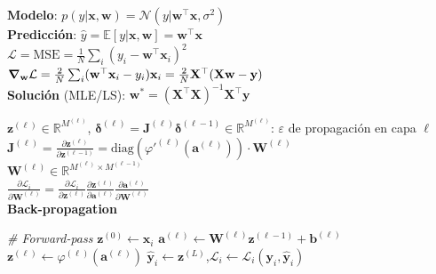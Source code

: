 \documentclass[11pt, a4paper]{article}
\newcommand{\w}{\mathbf{w}}
\newcommand{\x}{\mathbf{x}}
\newcommand{\X}{\mathbf{X}}
\newcommand{\y}{\mathbf{y}}
\newcommand{\z}{\mathbf{z}}
\newcommand{\del}{\boldsymbol{\delta}}
\newcommand{\bias}{\mathbf{b}}
\newcommand{\preact}{\mathbf{a}}
\newcommand{\W}{\mathbf{W}}
\newcommand{\Loss}{\mathcal{L}}
\begin{document}
\noindent

\begin{minipage}[t]{0.325\textwidth}
    \vspace{0pt}
    \begin{tcolorbox}[formulabox=Linear Regression, colframe=softRed]
        \textbf{Modelo}: $p(y|\x,\w)=\mathcal{N}(y|\w^\top\x,\sigma^2)$ \\
        \textbf{Predicción}: $\hat{y} = \mathbb{E}[y|\x,\w] =\w^\top \x$ \\
        $\Loss = \text{MSE} =\frac{1}{N}\sum_i (y_i - \w^\top \x_i)^2$ \\
        $\grad_\w \Loss = \frac{2}{N}\sum_i (\w^\top\x_i - y_i)\x_i = \frac{2}{N}\mathbf{X}^\top(\mathbf{X}\w - \y)$ \\
        \textbf{Solución} (MLE/LS): $\w^* = (\X^\top\X)^{-1}\X^\top\y$
    \end{tcolorbox}
    \begin{tcolorbox}[formulabox=Multi-layer Perceptron (MLP), colframe=softRed]
        $\z^{(\ell)} \in \mathbb{R}^{M^{(\ell)}}$, $\del^{(\ell)} =\mathbf{J}^{(\ell)} \boldsymbol{\delta}^{(\ell-1)}\in \mathbb{R}^{M^{(\ell)}}$: $\varepsilon$ de propagación en capa $\ell$\\
        $\mathbf{J}^{(\ell)}=\tfrac{\partial \z^{(\ell)}}{\partial \z^{(\ell-1)}}=\text{diag}(\varphi'^{(\ell)}(\preact^{(\ell)}))\cdot\W^{(\ell)}$ \\
        $\W^{(\ell)} \in \mathbb{R}^{M^{(\ell)}\times M^{(\ell-1)}}$ \\
        $\tfrac{\partial \Loss_i}{\partial \W^{(\ell)}}= \tfrac{\partial \Loss_i}{\partial \z^{(\ell)}} \tfrac{\partial \z^{(\ell)}}{\partial \preact^{(\ell)}} \tfrac{\partial \preact^{(\ell)}}{\partial \W^{(\ell)}}$ \\
        \vspace{-2mm}
        \tcbline
        \vspace{-2mm}
        \textbf{Back-propagation}
        \begin{algorithmic}[0]
            \Statex \textit{\# Forward-pass}
            \State $\z^{(0)} \leftarrow \x_i$
                \State $\preact^{(\ell)} \leftarrow \W^{(\ell)}\z^{(\ell-1)} + \bias^{(\ell)}$
                \State $\z^{(\ell)} \leftarrow \varphi^{(\ell)}(\preact^{(\ell)})$
            \EndFor
            \State $\hat{\y}_i \leftarrow \z^{(L)}$,\quad $\Loss_i \leftarrow \Loss_i(\y_i, \hat{\y}_i)$

\end{algorithmic}
\end{tcolorbox}
\end{minipage}
\end{document}
